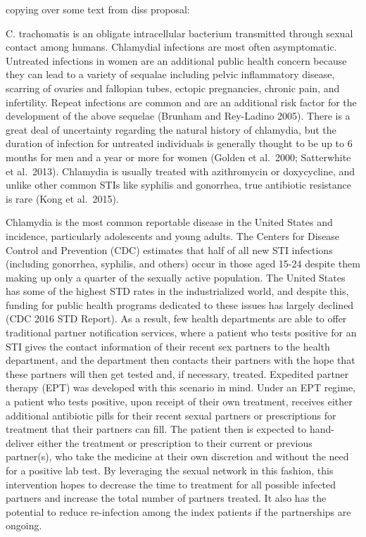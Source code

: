 \documentclass [11pt, proquest] {uwthesis}[2015/03/03]
\begin{document}
copying over some text from diss proposal:

C. trachomatis is an obligate intracellular bacterium transmitted through sexual contact among humans. Chlamydial infections are most often asymptomatic. Untreated infections in women are an additional public health concern because they can lead to a variety of sequalae including pelvic inflammatory disease, scarring of ovaries and fallopian tubes, ectopic pregnancies, chronic pain, and infertility. Repeat infections are common and are an additional risk factor for the development of the above sequelae (Brunham and Rey-Ladino 2005). There is a great deal of uncertainty regarding the natural history of chlamydia, but the duration of infection for untreated individuals is generally thought to be up to 6 months for men and a year or more for women (Golden et al.~2000; Satterwhite et al.~2013). Chlamydia is usually treated with azithromycin or doxycycline, and unlike other common STIs like syphilis and gonorrhea, true antibiotic resistance is rare (Kong et al.~2015).

Chlamydia is the most common reportable disease in the United States and incidence, particularly adolescents and young adults. The Centers for Disease Control and Prevention (CDC) estimates that half of all new STI infections (including gonorrhea, syphilis, and others) occur in those aged 15-24 despite them making up only a quarter of the sexually active population. The United States has some of the highest STD rates in the industrialized world, and despite this, funding for public health programs dedicated to these issues has largely declined (CDC 2016 STD Report). As a result, few health departments are able to offer traditional partner notification services, where a patient who tests positive for an STI gives the contact information of their recent sex partners to the health department, and the department then contacts their partners with the hope that these partners will then get tested and, if necessary, treated. Expedited partner therapy (EPT) was developed with this scenario in mind. Under an EPT regime, a patient who tests positive, upon receipt of their own treatment, receives either additional antibiotic pills for their recent sexual partners or prescriptions for treatment that their partners can fill. The patient then is expected to hand-deliver either the treatment or prescription to their current or previous partner(s), who take the medicine at their own discretion and without the need for a positive lab test. By leveraging the sexual network in this fashion, this intervention hopes to decrease the time to treatment for all possible infected partners and increase the total number of partners treated. It also has the potential to reduce re-infection among the index patients if the partnerships are ongoing.
\end{document}
